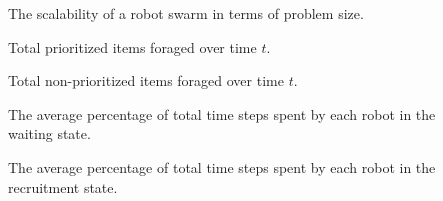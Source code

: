 \begin{description}
	\item[\parbox{\namewidth}{$S_p$}] The scalability of a robot swarm in terms of problem size.	
	
	\item[\parbox{\namewidth}{$E^t_P$}] Total prioritized items foraged over time $t$.	

	\item[\parbox{\namewidth}{$E^t_{NP}$}] Total non-prioritized items foraged over time $t$.	
	
	\item[\parbox{\namewidth}{$t_{wait}$}] The average percentage of total time steps spent by each robot in the waiting state.

	\item[\parbox{\namewidth}{$t_{recruitment}$}] The average percentage of total time steps spent by each robot in the recruitment state. 
	
	

\end{description}
